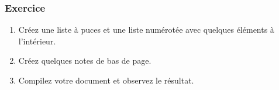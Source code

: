 
\begin{frame}[c]

	\frametitle{Exercice \thenoExercice}
	
	\begin{enumerate}
		\item Créez une liste à puces et une liste numérotée avec quelques éléments à l'intérieur.
		\item Créez quelques notes de bas de page.
		\item Compilez votre document et observez le résultat.
	\end{enumerate}
\end{frame}
